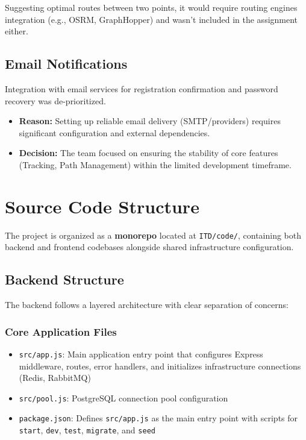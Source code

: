  Suggesting optimal routes between two points, it would require routing engines integration (e.g., OSRM, GraphHopper) and wasn't included in the assignment either.

\subsection{Email Notifications}
\label{subsec:excluded_email}

Integration with email services for registration confirmation and password recovery was de-prioritized.
\begin{itemize}
    \item \textbf{Reason:} Setting up reliable email delivery (SMTP/providers) requires significant configuration and external dependencies.
    \item \textbf{Decision:} The team focused on ensuring the stability of core features (Tracking, Path Management) within the limited development timeframe.
\end{itemize}

\section{Source Code Structure}
\label{sec:source_code_structure}

The project is organized as a \textbf{monorepo} located at \texttt{ITD/code/}, containing both backend and frontend codebases alongside shared infrastructure configuration.

\subsection{Backend Structure}
\label{subsec:backend_structure}

The backend follows a layered architecture with clear separation of concerns:

\subsubsection{Core Application Files}
\begin{itemize}
    \item \texttt{src/app.js}: Main application entry point that configures Express middleware, routes, error handlers, and initializes infrastructure connections (Redis, RabbitMQ)
    \item \texttt{src/pool.js}: PostgreSQL connection pool configuration
    \item \texttt{package.json}: Defines \texttt{src/app.js} as the main entry point with scripts for \texttt{start}, \texttt{dev}, \texttt{test}, \texttt{migrate}, and \texttt{seed}
\end{itemize}

